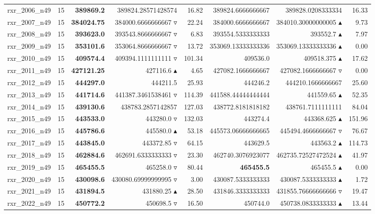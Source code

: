 \begin{table}[]
{\begin{tabular}{ll@{\hspace{1.2cm}}rrr@{\hspace{1.2cm}}rrr}
rxr_2006_n49 & 15 & \textbf{389869.2} & 389824.28571428574 \phantom{$\blacktriangle$} & 16.82 & 389824.6666666667 & 389828.0208333334 \phantom{$\blacktriangle$} & 16.33 \\
rxr_2007_n49 & 15 & \textbf{384024.75} & 384000.6666666667 $\triangledown$ & 22.24 & 384000.6666666667 & 384010.30000000005 $\blacktriangle$ & 9.73 \\
rxr_2008_n49 & 15 & \textbf{393623.0} & 393543.8666666667 $\triangledown$ & 6.83 & 393554.5333333333 & 393552.7 $\blacktriangle$ & 7.97 \\
rxr_2009_n49 & 15 & \textbf{353101.6} & 353064.8666666667 $\triangledown$ & 13.72 & 353069.13333333336 & 353069.13333333336 $\blacktriangle$ & 0.00 \\
rxr_2010_n49 & 15 & \textbf{409574.4} & 409394.1111111111 $\triangledown$ & 101.34 & 409536.0 & 409518.375 $\blacktriangle$ & 17.62 \\
rxr_2011_n49 & 15 & \textbf{427121.25} & 427116.6 $\blacktriangle$ & 4.65 & 427082.1666666667 & 427082.1666666667 $\triangledown$ & 0.00 \\
rxr_2012_n49 & 15 & \textbf{444297.0} & 444211.5 \phantom{$\blacktriangle$} & 25.93 & 444246.2 & 444210.1666666667 \phantom{$\blacktriangle$} & 25.60 \\
rxr_2013_n49 & 15 & \textbf{441714.6} & 441387.3461538461 $\triangledown$ & 114.39 & 441588.44444444444 & 441559.65 $\blacktriangle$ & 52.35 \\
rxr_2014_n49 & 15 & \textbf{439130.6} & 438783.2857142857 \phantom{$\blacktriangle$} & 127.03 & 438772.8181818182 & 438761.7111111111 \phantom{$\blacktriangle$} & 84.04 \\
rxr_2015_n49 & 15 & \textbf{443533.0} & 443280.0 $\triangledown$ & 132.03 & 443274.4 & 443368.625 $\blacktriangle$ & 151.96 \\
rxr_2016_n49 & 15 & \textbf{445786.6} & 445580.0 $\blacktriangle$ & 53.18 & 445573.06666666665 & 445494.4666666667 $\triangledown$ & 76.67 \\
rxr_2017_n49 & 15 & \textbf{443845.0} & 443372.85 $\triangledown$ & 64.15 & 443629.5 & 443563.2 $\blacktriangle$ & 114.73 \\
rxr_2018_n49 & 15 & \textbf{462884.6} & 462691.6333333333 $\triangledown$ & 23.30 & 462740.3076923077 & 462735.72527472524 $\blacktriangle$ & 41.97 \\
rxr_2019_n49 & 15 & \textbf{465455.5} & 465258.0 $\triangledown$ & 80.44 & \textbf{465455.5} & 465455.5 $\blacktriangle$ & 0.00 \\
rxr_2020_n49 & 15 & \textbf{430098.6} & 430080.69999999995 $\triangledown$ & 3.00 & 430087.5333333333 & 430087.5333333333 $\blacktriangle$ & 1.72 \\
rxr_2021_n49 & 15 & \textbf{431894.5} & 431880.25 $\blacktriangle$ & 28.50 & 431846.3333333333 & 431855.76666666666 $\triangledown$ & 19.47 \\
rxr_2022_n49 & 15 & \textbf{450772.2} & 450698.5 $\triangledown$ & 16.50 & 450744.0 & 450738.0833333333 $\blacktriangle$ & 13.44 \\
\bottomrule
    \end{tabular}
    }
\end{table}

